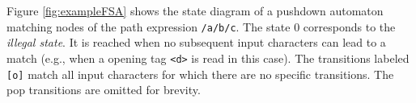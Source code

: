 Figure \ref{fig:exampleFSA} shows the state diagram of a pushdown automaton
matching nodes of the path expression \verb;/a/b/c;. The state $0$ corresponds
to the \emph{illegal state}. It is reached when no subsequent input characters
can lead to a match (e.g., when a opening tag \verb;<d>; is read in this case).
The transitions labeled \verb;[o]; match all input characters for which there
are no specific transitions. The pop transitions are omitted for brevity.






